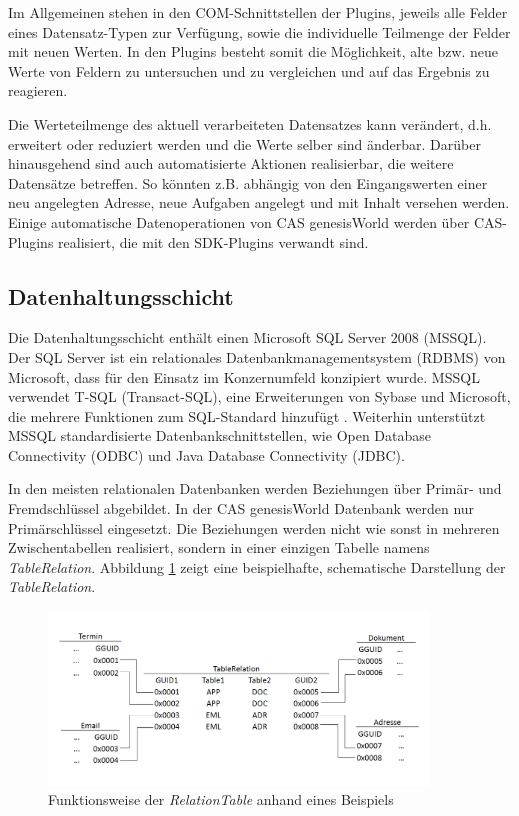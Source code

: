 Im Allgemeinen stehen in den COM-Schnittstellen der Plugins, jeweils alle Felder eines Datensatz-Typen zur Verfügung, sowie die individuelle Teilmenge der Felder mit neuen Werten. In den Plugins besteht somit die Möglichkeit, alte bzw. neue Werte von Feldern zu untersuchen und zu vergleichen und auf das Ergebnis zu reagieren.

Die Werteteilmenge des aktuell verarbeiteten Datensatzes kann verändert, d.h. erweitert oder reduziert werden und die Werte selber sind änderbar. Darüber hinausgehend sind auch automatisierte Aktionen realisierbar, die weitere Datensätze betreffen. So könnten z.B. abhängig von den Eingangswerten einer neu angelegten Adresse, neue Aufgaben angelegt und mit Inhalt versehen werden. Einige automatische Datenoperationen von CAS genesisWorld werden über CAS-Plugins realisiert, die mit den SDK-Plugins verwandt sind.

\subsection{Datenhaltungsschicht}
\label{ch:Systemanalyse:sec:genesisWorld:subsec:db}

Die Datenhaltungsschicht enthält einen Microsoft SQL Server 2008 (MSSQL). Der SQL Server ist ein relationales Datenbankmanagementsystem (RDBMS) von Microsoft, dass für den Einsatz im Konzernumfeld konzipiert wurde. MSSQL verwendet T-SQL (Transact-SQL), eine Erweiterungen von Sybase und Microsoft, die mehrere Funktionen zum SQL-Standard hinzufügt \cite{tech2013}. Weiterhin unterstützt MSSQL standardisierte Datenbankschnittstellen, wie Open Database Connectivity (ODBC) und Java Database Connectivity (JDBC).
  
In den meisten relationalen Datenbanken werden Beziehungen über Primär- und Fremdschlüssel abgebildet. In der CAS genesisWorld Datenbank werden nur Primärschlüssel eingesetzt. Die Beziehungen werden nicht wie sonst in mehreren Zwischentabellen realisiert, sondern in einer einzigen Tabelle namens \textit{TableRelation}. Abbildung \ref{gw_2} zeigt eine beispielhafte, schematische Darstellung der \textit{TableRelation}.

\begin{figure}[ht]
	\centering
  \includegraphics[width=0.9\textwidth, width=0.9\textwidth]{pics/gW_tablerealtion.png}
	\caption{Funktionsweise der \textit{RelationTable} anhand eines Beispiels}
	\label{gw_2}
\end{figure}

